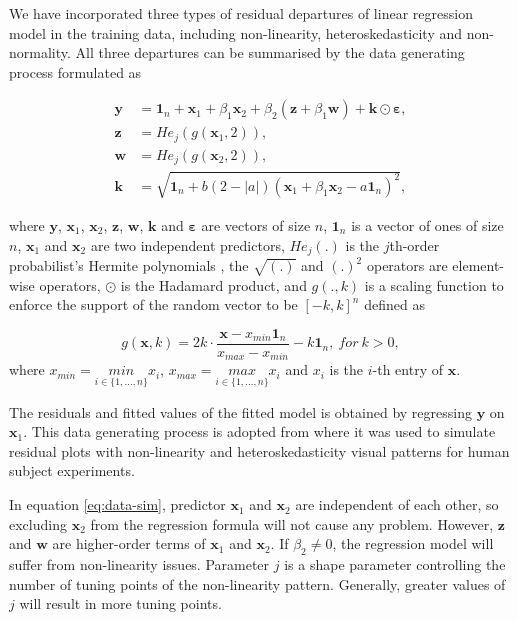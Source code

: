 \documentclass[]{interact}
\theoremstyle{plain}%
\theoremstyle{definition}
\theoremstyle{remark}
\begin{document}
We have incorporated three types of residual departures of linear
regression model in the training data, including non-linearity,
heteroskedasticity and non-normality. All three departures can be
summarised by the data generating process formulated as

\begin{align}
\label{eq:data-sim}
\boldsymbol{y} &= \boldsymbol{1}_n + \boldsymbol{x}_1 + \beta_1\boldsymbol{x}_2 + \beta_2(\boldsymbol{z} + \beta_1\boldsymbol{w}) + \boldsymbol{k} \odot \boldsymbol{\varepsilon}, \\
\boldsymbol{z} &= He_j(g(\boldsymbol{x}_1, 2)), \\
\boldsymbol{w} &= He_j(g(\boldsymbol{x}_2, 2)), \\
\boldsymbol{k} &= \sqrt{\boldsymbol{1}_n + b(2 - |a|)(\boldsymbol{x}_1 + \beta_1\boldsymbol{x}_2 - a\boldsymbol{1}_n)^2},
\end{align}

\noindent where \(\boldsymbol{y}\), \(\boldsymbol{x}_1\),
\(\boldsymbol{x}_2\), \(\boldsymbol{z}\), \(\boldsymbol{w}\),
\(\boldsymbol{k}\) and \(\boldsymbol{\varepsilon}\) are vectors of size
\(n\), \(\boldsymbol{1}_n\) is a vector of ones of size \(n\),
\(\boldsymbol{x}_1\) and \(\boldsymbol{x}_2\) are two independent
predictors, \(He_j(.)\) is the \(j\)th-order probabilist's Hermite
polynomials \citep{hermite1864nouveau}, the \(\sqrt{(.)}\) and \((.)^2\)
operators are element-wise operators, \(\odot\) is the Hadamard product,
and \(g(., k)\) is a scaling function to enforce the support of the
random vector to be \([-k, k]^n\) defined as

\[g(\boldsymbol{x}, k) = 2k \cdot \frac{\boldsymbol{x} - x_{min}\boldsymbol{1}_n}{x_{max} - x_{min}} - k\boldsymbol{1}_n,~for~k > 0,\]
\noindent where \(x_{min} = \underset{i \in \{ 1,...,n\}}{min} x_i\),
\(x_{max} = \underset{i \in \{ 1,...,n\}}{max} x_i\) and \(x_i\) is the
\(i\)-th entry of \(\boldsymbol{x}\).

The residuals and fitted values of the fitted model is obtained by
regressing \(\boldsymbol{y}\) on \(\boldsymbol{x}_1\). This data
generating process is adopted from \citet{li2023plot} where it was used
to simulate residual plots with non-linearity and heteroskedasticity
visual patterns for human subject experiments.

In equation \ref{eq:data-sim}, predictor \(\boldsymbol{x}_1\) and
\(\boldsymbol{x}_2\) are independent of each other, so excluding
\(\boldsymbol{x}_2\) from the regression formula will not cause any
problem. However, \(\boldsymbol{z}\) and \(\boldsymbol{w}\) are
higher-order terms of \(\boldsymbol{x}_1\) and \(\boldsymbol{x}_2\). If
\(\beta_2 \neq 0\), the regression model will suffer from non-linearity
issues. Parameter \(j\) is a shape parameter controlling the number of
tuning points of the non-linearity pattern. Generally, greater values of
\(j\) will result in more tuning points.
\end{document}
